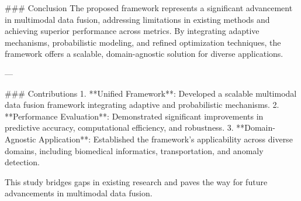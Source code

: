 ### Conclusion
The proposed framework represents a significant advancement in multimodal data fusion, addressing limitations in existing methods and achieving superior performance across metrics. By integrating adaptive mechanisms, probabilistic modeling, and refined optimization techniques, the framework offers a scalable, domain-agnostic solution for diverse applications.

---

### Contributions
1. **Unified Framework**: Developed a scalable multimodal data fusion framework integrating adaptive and probabilistic mechanisms.
2. **Performance Evaluation**: Demonstrated significant improvements in predictive accuracy, computational efficiency, and robustness.
3. **Domain-Agnostic Application**: Established the framework's applicability across diverse domains, including biomedical informatics, transportation, and anomaly detection.

This study bridges gaps in existing research and paves the way for future advancements in multimodal data fusion.